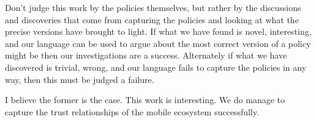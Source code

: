 \documentclass[thesis.tex]{subfiles}
\begin{document}
Don't judge this work by the policies themselves, but rather by the discussions
and discoveries that come from capturing the policies and looking at what the
precise versions have brought to light.  If what we have found is novel,
interesting, and our language can be used to argue about the most correct
version of a policy might be then our investigations are a success.
Alternately if what we have discovered is trivial, wrong, and our language
fails to capture the policies in any way, then this must be judged a failure.

I believe the former is the case.  This work is interesting. We do manage to
capture the trust relationships of the mobile ecosystem successfully.
\end{document}

